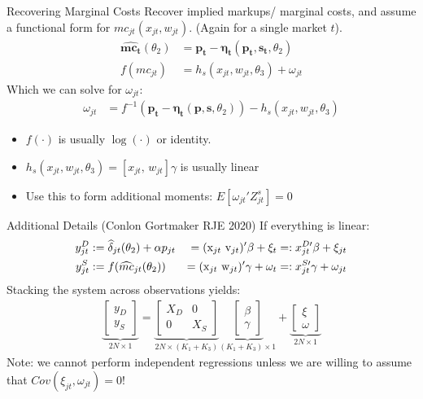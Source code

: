 \begin{frame}{Recovering Marginal Costs }
Recover implied markups/ marginal costs, and assume a functional form for $mc_{jt}(x_{jt},w_{jt})$. (Again for a single market $t$).
\begin{align*}
\widehat{\mathbf{mc_t}}(\theta_2)&= \mathbf{p_t}- \boldsymbol{\eta_t}(\mathbf{p_t},\mathbf{s_t},\theta_2)\\
f(mc_{jt}) &= h_s(x_{jt} , w_{jt},\theta_3)+ \omega_{jt}
\end{align*}
Which we can solve for $\omega_{jt}$:
\begin{align*}
\omega_{jt} &=  f^{-1}(\mathbf{p_t}- \boldsymbol{\eta_t}(\mathbf{p},\mathbf{s},\theta_2)) - h_s(x_{jt},w_{jt},\theta_3)
\end{align*}
\vspace{-0.4cm}
\begin{itemize}
\item $f(\cdot)$ is usually $\log(\cdot)$ or identity.
\item $h_s(x_{jt},w_{jt},\theta_3) = [x_{jt}, \, w_{jt}] \gamma$ is usually linear
\item Use this to form additional moments: $E[\omega_{jt}' Z_{jt}^{s}]=0$
\end{itemize}
\end{frame}


\begin{frame}{Additional Details (Conlon Gortmaker RJE 2020)}
If everything is linear:
\begin{alignat*}{3}
\label{eq:stacked}
\nonumber y_{jt}^D &:= \widehat \delta_{jt}(\theta_2) + \alpha p_{jt} &=(\textrm{x}_{jt} \-\ \textrm{v}_{jt})' \beta + \xi_t &=: x_{jt}^{D\prime}\beta + \xi_{jt} \\ 
y_{jt}^S &:= f(\widehat{mc}_{jt}(\theta_2)) &= (\textrm{x}_{jt} \-\ \textrm{w}_{jt})'\gamma + \omega_t &=: x_{jt}^{S\prime} \gamma + \omega_{jt} 
\end{alignat*}
Stacking the system across observations yields:
\begin{align*}
\underbrace{\begin{bmatrix} y_D \\ y_S \end{bmatrix}}_{2N\times1} = 
\underbrace{\begin{bmatrix}
X_D & 0 \\
0 & X_S 
\end{bmatrix}}_{2N\times(K_1+K_3)}
\underbrace{\begin{bmatrix}
\beta \\ \gamma %
\end{bmatrix}}_{(K_1+K_3)\times1} + 
\underbrace{\begin{bmatrix}
\xi \\ \omega %
\end{bmatrix}}_{2N\times 1}
\end{align*}
Note: we cannot perform independent regressions unless we are willing to assume that $Cov(\xi_{jt},\omega_{jt})=0$!
\end{frame}




